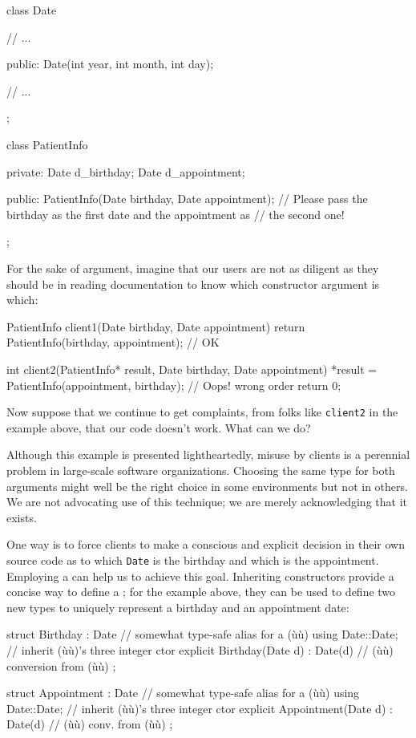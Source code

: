 \begin{emcppslisting}[emcppsbatch=e5]
class Date
{
    // ...

public:
    Date(int year, int month, int day);

    // ...
};

class PatientInfo
{
private:
    Date d_birthday;
    Date d_appointment;

public:
    PatientInfo(Date birthday, Date appointment);
        // Please pass the birthday as the first date and the appointment as
        // the second one!
};
\end{emcppslisting}

\noindent For the sake of argument, imagine that our users are not as diligent as
they should be in reading documentation to know which constructor
argument is which:

\begin{emcppslisting}[emcppsbatch=e5]
PatientInfo client1(Date birthday, Date appointment)
{
    return PatientInfo(birthday, appointment);  // OK
}

int client2(PatientInfo* result, Date birthday, Date appointment)
{
    *result = PatientInfo(appointment, birthday);  // Oops! wrong order
    return 0;
}
\end{emcppslisting}

\noindent Now suppose that we continue to get complaints, from folks like
\lstinline!client2! in the example above, that our code doesn't work. What can we
do?

Although this example is presented lightheartedly, misuse by clients is a perennial problem in large-scale
software organizations. Choosing the same type for both arguments
might well be the right choice in some environments but not in others.
We are not advocating use of this technique; we are merely
  acknowledging that it exists.

One way is to force clients to make a conscious and explicit decision in
their own source code as to which \lstinline!Date! is the birthday and
which is the appointment. Employing a 
can help us to achieve this goal. Inheriting constructors provide a
concise way to define a ; for
the example above, they can be used to define two new types to
 uniquely represent a birthday and an appointment date:

\begin{emcppslisting}[emcppsbatch=e5]
struct Birthday : Date  // somewhat type-safe alias for a (ù{}ù)
{
    using Date::Date;  // inherit (ù{}ù)'s three integer ctor
    explicit Birthday(Date d) : Date(d) { }  // (ù{}ù) conversion from (ù{}ù)
};

struct Appointment : Date  // somewhat type-safe alias for a (ù{}ù)
{
    using Date::Date;  // inherit (ù{}ù)'s three integer ctor
    explicit Appointment(Date d) : Date(d) { }  // (ù{}ù) conv. from (ù{}ù)
};
\end{emcppslisting}

